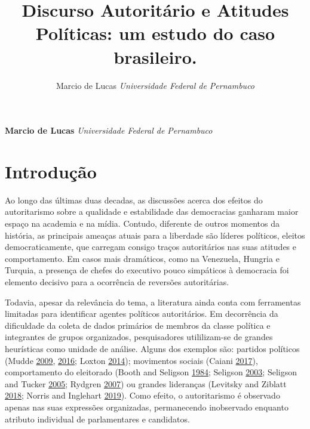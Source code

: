 \documentclass[12 pt,]{article}
\title{Discurso Autoritário e Atitudes Políticas: um estudo do caso brasileiro.  }
\author{\Large Marcio de Lucas\vspace{0.05in} \newline\normalsize\emph{Universidade Federal de Pernambuco}  }
\date{}
\newcommand*{\authorfont}{\fontfamily{phv}\selectfont}
\begin{document}
	
%

{%
\setlength{\parindent}{0pt}
\thispagestyle{plain}
{\fontsize{18}{20}\selectfont\raggedright 
\maketitle  %

}

{
   \vskip 13.5pt\relax \normalsize\fontsize{11}{12} 
\textbf{\authorfont Marcio de Lucas} \hskip 15pt \emph{\small Universidade Federal de Pernambuco}   

}

}






\vskip 6.5pt


\noindent \doublespacing \hypertarget{introducao}{%
\section{Introdução}\label{introducao}}

Ao longo das últimas duas decadas, as discussões acerca dos efeitos do
autoritarismo sobre a qualidade e estabilidade das democracias ganharam
maior espaço na academia e na mídia. Contudo, diferente de outros
momentos da história, as principais ameaças atuais para a liberdade são
líderes políticos, eleitos democraticamente, que carregam consigo traços
autoritários nas suas atitudes e comportamento. Em casos mais
dramáticos, como na Venezuela, Hungria e Turquia, a presença de chefes
do executivo pouco simpáticos à democracia foi elemento decisivo para a
ocorrência de reversões autoritárias.

Todavia, apesar da relevância do tema, a literatura ainda conta com
ferramentas limitadas para identificar agentes políticos autoritários.
Em decorrência da dificuldade da coleta de dados primários de membros da
classe política e integrantes de grupos organizados, pesquisadores
utililizam-se de grandes heurísticas como unidade de análise. Alguns dos
exemplos são: partidos políticos (Mudde
\protect\hyperlink{ref-mudde2009populist}{2009},
\protect\hyperlink{ref-mudde2016introduction}{2016}; Loxton
\protect\hyperlink{ref-loxton2014authoritarian}{2014}); movimentos
sociais (Caiani \protect\hyperlink{ref-caiani2017radical}{2017}),
comportamento do eleitorado (Booth and Seligson
\protect\hyperlink{ref-booth1984political}{1984}; Seligson
\protect\hyperlink{ref-seligson2003democracies}{2003}; Seligson and
Tucker \protect\hyperlink{ref-seligson2005feeding}{2005}; Rydgren
\protect\hyperlink{ref-rydgren2007sociology}{2007}) ou grandes
lideranças (Levitsky and Ziblatt
\protect\hyperlink{ref-levitsky2018democracies}{2018}; Norris and
Inglehart \protect\hyperlink{ref-norris2019cultural}{2019}). Como
efeito, o autoritarismo é observado apenas nas suas expressões
organizadas, permanecendo inobservado enquanto atributo individual de
parlamentares e candidatos.
\end{document}

